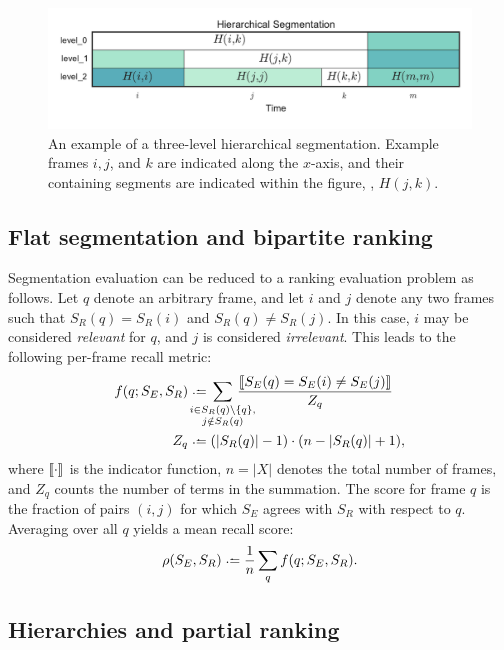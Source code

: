 \documentclass{article}
\begin{document}
\begin{figure}
  \centering
  \includegraphics[width=\columnwidth]{figs/hier-example.pdf}
  \caption{An example of a three-level hierarchical segmentation.
  Example frames $i, j$, and $k$ are indicated along the $x$-axis, and their containing segments are indicated
  within the figure, \eg, $H(j, k)$.}\label{fig:hier-example}
\end{figure}


\subsection{Flat segmentation and bipartite ranking}

Segmentation evaluation can be reduced to a ranking evaluation problem as follows.
Let $q$ denote an arbitrary frame, and let $i$ and $j$ denote any two frames such that $S_R(q) = S_R(i)$ and $S_R(q) \neq S_R(j)$.
In this case, $i$ may be considered \emph{relevant} for $q$, and $j$ is considered \emph{irrelevant}.
This leads to the following per-frame recall metric:
\begin{align}
f(q ; S_E, S_R) &\defeq  \hspace{-1.5em} \sum_{\substack{i \in S_R(q) \setminus \{q\},\\ j \notin S_R(q)}}
\hspace{-1.5em}\frac{\ind{S_E(q) = S_E(i) \neq S_E(j) }}{Z_q} \label{flatrecall}\\
Z_q &\defeq (|S_R(q)| - 1)\cdot (n - |S_R(q)| + 1), \notag
\end{align}
where $\left\llbracket\cdot\right\rrbracket$ is the indicator function, $n = |X|$ denotes the total number of frames, and $Z_q$
counts the number of terms in the summation.
The score for frame $q$ is the fraction of pairs $(i, j)$ for which $S_E$
agrees with $S_R$ with respect to $q$.
Averaging over all $q$ yields a mean recall score:
\begin{equation}
\rho(S_E, S_R) \defeq \frac{1}{n} \sum_q f(q ; S_E, S_R).\label{avgrecall}
\end{equation}


\subsection{Hierarchies and partial ranking}
\end{document}
